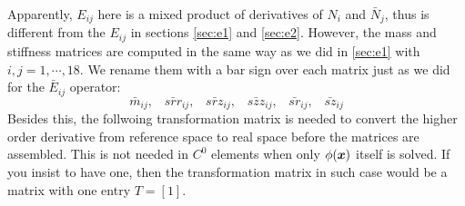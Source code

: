 \documentclass{report}
\newcommand{\bm}[1]{\mbox{\boldmath $#1$}}
\begin{document}
Apparently, $E_{ij}$ here is a mixed product of derivatives of $N_i$ and $\bar{N}_j$,
thus is different from the $E_{ij}$ in sections \ref{sec:e1} and \ref{sec:e2}.
However, the mass and stiffness matrices are computed in the same way as we did in \ref{sec:e1}
with $i,j=1,\cdots,18$.
We rename them with a bar sign over each matrix just as we did for the $\bar{E}_{ij}$ operator:
$$
\bar{m}_{ij}, \;\;\;
\bar{srr}_{ij}, \;\;\;
\bar{srz}_{ij}, \;\;\;
\bar{szz}_{ij}, \;\;\;
\bar{sr}_{ij}, \;\;\;
\bar{sz}_{ij}
$$
Besides this,
the follwoing transformation matrix is needed to convert the higher order derivative from
reference space to real space before the matrices are assembled. 
This is not needed in $C^0$ elements when only $\phi(\bm{x})$ itself is solved.
If you insist to have one, then the transformation matrix in such case would be 
a matrix with one entry $T=[ 1 ]$.
\end{document}
